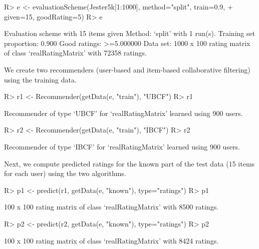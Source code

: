 \documentclass[nojss]{jss}
\begin{document}
\begin{Schunk}
\begin{Sinput}
R> e <- evaluationScheme(Jester5k[1:1000], method="split", train=0.9, 
+     given=15, goodRating=5)
R> e
\end{Sinput}
\begin{Soutput}
Evaluation scheme with 15 items given
Method: ‘split’ with 1 run(s).
Training set proportion: 0.900
Good ratings: >=5.000000
Data set: 1000 x 100 rating matrix of class ‘realRatingMatrix’ with 72358 ratings.
\end{Soutput}
\end{Schunk}

We create two recommenders (user-based and item-based collaborative filtering) 
using the training data.

\begin{Schunk}
\begin{Sinput}
R> r1 <- Recommender(getData(e, "train"), "UBCF")
R> r1
\end{Sinput}
\begin{Soutput}
Recommender of type ‘UBCF’ for ‘realRatingMatrix’ 
learned using 900 users.
\end{Soutput}
\begin{Sinput}
R> r2 <- Recommender(getData(e, "train"), "IBCF")
R> r2
\end{Sinput}
\begin{Soutput}
Recommender of type ‘IBCF’ for ‘realRatingMatrix’ 
learned using 900 users.
\end{Soutput}
\end{Schunk}

Next, we compute predicted ratings for the known part of the test data (15 items 
for each user) using 
the two algorithms. 

\begin{Schunk}
\begin{Sinput}
R> p1 <- predict(r1, getData(e, "known"), type="ratings")
R> p1
\end{Sinput}
\begin{Soutput}
100 x 100 rating matrix of class ‘realRatingMatrix’ with 8500 ratings.
\end{Soutput}
\begin{Sinput}
R> p2 <- predict(r2, getData(e, "known"), type="ratings")
R> p2
\end{Sinput}
\begin{Soutput}
100 x 100 rating matrix of class ‘realRatingMatrix’ with 8424 ratings.
\end{Soutput}
\end{Schunk}
\end{document}
